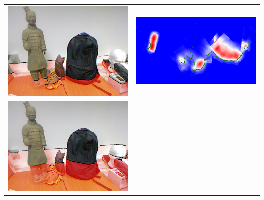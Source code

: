 \documentclass[10pt,onecolumn,letterpaper]{article}
\begin{document}
\begin{tabular}{cc}
\centering
\includegraphics[height=\imheight]{real/statue/rgb_00050.png} &
\includegraphics[height=\imheight]{real/statue/slice_00050.png} \\
\includegraphics[height=\imheight]{real/statue/rgb_00080.png} &

\end{tabular}
\end{document}
